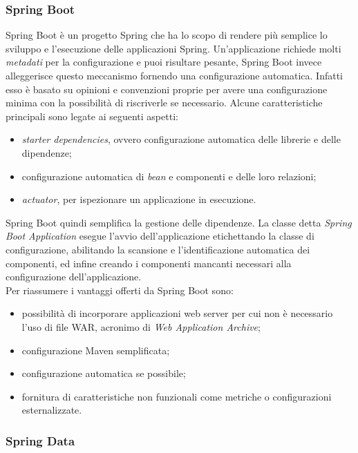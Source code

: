 \subsubsection{Spring Boot}
\label{subsubsec:spring-boot}

Spring Boot è un progetto Spring che ha lo scopo di rendere più semplice lo sviluppo e l'esecuzione delle applicazioni Spring. Un'applicazione richiede molti \textit{metadati} per la configurazione e puoi risultare pesante, Spring Boot invece alleggerisce questo meccanismo fornendo una configurazione automatica. Infatti esso è basato su opinioni e convenzioni proprie per avere una configurazione minima con la possibilità di riscriverle se necessario. Alcune caratteristiche principali sono legate ai seguenti aspetti:
\begin{itemize}
	\item \textit{starter dependencies}, ovvero configurazione automatica delle librerie e delle dipendenze;
	\item configurazione automatica di \textit{bean} e componenti e delle loro relazioni;
	\item \textit{actuator}, per ispezionare un applicazione in esecuzione.
\end{itemize} 
Spring Boot quindi semplifica la gestione delle dipendenze. La classe detta \textit{Spring Boot Application} esegue l'avvio dell'applicazione etichettando la classe di configurazione, abilitando la scansione e l'identificazione automatica dei componenti, ed infine creando i componenti mancanti necessari alla configurazione dell'applicazione.\\
Per riassumere i vantaggi offerti da Spring Boot sono:
\begin{itemize}
	\item possibilità di incorporare applicazioni web server per cui non è necessario l'uso di file WAR, acronimo di \textit{Web Application Archive};
	\item configurazione Maven semplificata;
	\item configurazione automatica se possibile;
	\item fornitura di caratteristiche non funzionali come metriche o configurazioni esternalizzate.
\end{itemize}

\subsubsection{Spring Data}
\label{subsubsec:spring-data}

